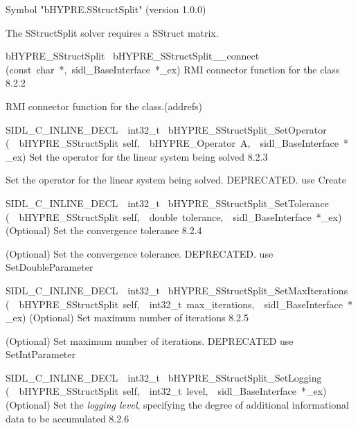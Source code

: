 \documentclass{article}
\begin{document}
\begin{cxxentry}
\begin{cxxentry}
\begin{cxxvariable}
\begin{cxxdoc}
Symbol "bHYPRE.SStructSplit" (version 1.0.0)


The SStructSplit solver requires a SStruct matrix.
\end{cxxdoc}
\end{cxxvariable}
\begin{cxxfunction}
{bHYPRE\_SStructSplit\ }
        {bHYPRE\_SStructSplit\_\_connect}
        {(const\ char\ *,\ sidl\_BaseInterface\ *\_ex)}
        {
RMI connector function for the class}
        {8.2.2}
\begin{cxxdoc}

RMI connector function for the class.(addrefs)
\end{cxxdoc}
\end{cxxfunction}
\begin{cxxfunction}
{SIDL\_C\_INLINE\_DECL\ \ int32\_t\ }
        {bHYPRE\_SStructSplit\_SetOperator}
        {(\ \ bHYPRE\_SStructSplit\ self,\ \ bHYPRE\_Operator\ A,\ \ sidl\_BaseInterface\ *\_ex)}
        {
Set the operator for the linear system being solved}
        {8.2.3}
\begin{cxxdoc}

Set the operator for the linear system being solved.
DEPRECATED.  use Create
\end{cxxdoc}
\end{cxxfunction}
\begin{cxxfunction}
{SIDL\_C\_INLINE\_DECL\ \ int32\_t\ }
        {bHYPRE\_SStructSplit\_SetTolerance}
        {(\ \ bHYPRE\_SStructSplit\ self,\ \ double\ tolerance,\ \ sidl\_BaseInterface\ *\_ex)}
        {
(Optional) Set the convergence tolerance}
        {8.2.4}
\begin{cxxdoc}

(Optional) Set the convergence tolerance.
DEPRECATED.  use SetDoubleParameter
\end{cxxdoc}
\end{cxxfunction}
\begin{cxxfunction}
{SIDL\_C\_INLINE\_DECL\ \ int32\_t\ }
        {bHYPRE\_SStructSplit\_SetMaxIterations}
        {(\ \ bHYPRE\_SStructSplit\ self,\ \ int32\_t\ max\_iterations,\ \ sidl\_BaseInterface\ *\_ex)}
        {
(Optional) Set maximum number of iterations}
        {8.2.5}
\begin{cxxdoc}

(Optional) Set maximum number of iterations.
DEPRECATED   use SetIntParameter
\end{cxxdoc}
\end{cxxfunction}
\begin{cxxfunction}
{SIDL\_C\_INLINE\_DECL\ \ int32\_t\ }
        {bHYPRE\_SStructSplit\_SetLogging}
        {(\ \ bHYPRE\_SStructSplit\ self,\ \ int32\_t\ level,\ \ sidl\_BaseInterface\ *\_ex)}
        {
(Optional) Set the {\it logging level}, specifying the degree
of additional informational data to be accumulated}
        {8.2.6}
\begin{cxxdoc}


\end{cxxdoc}
\end{cxxfunction}
\end{cxxentry}
\end{cxxentry}
\end{document}

